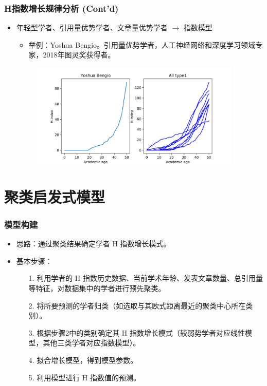 \documentclass[11pt,compress,t, xcolor=table]{beamer}
\begin{document}
\begin{frame}
	\frametitle{H指数增长规律分析 (Cont'd)}

\begin{itemize}
	\item 年轻型学者、引用量优势学者、文章量优势学者 $\rightarrow$ \textcolor{TsinghuaPurple}{指数模型}
	\begin{itemize}
		\item 举例：Yoshua Bengio。引用量优势学者，人工神经网络和深度学习领域专家，2018年图灵奖获得者。
	\end{itemize}
	
	\begin{figure}[H]
		\small
		\centering
		\includegraphics[width=10cm]{image/Yoshua Bengio.png}
	\end{figure}
\end{itemize}
\end{frame}

\section[聚类启发式模型]{聚类启发式模型}

\begin{frame}
	\frametitle{模型构建}
	
\begin{itemize}
	\item 思路：通过聚类结果确定学者 H 指数增长模式。
	\smallskip
	
	\item 基本步骤：
	\begin{itemize}
		\item[1.] 利用学者的 H 指数历史数据、当前学术年龄、发表文章数量、总引用量等特征，对数据集中的学者进行预先聚类。
		\smallskip
		\item[2.] 将所要预测的学者归类（如选取与其欧式距离最近的聚类中心所在类别）。
		\smallskip
		\item[3.] 根据步骤2中的类别确定其 H 指数增长模式（较弱势学者对应线性模型，其他三类学者对应指数模型）。
		\smallskip
		\item[4.] 拟合增长模型，得到模型参数。
		\smallskip
		\item[5.] 利用模型进行 H 指数值的预测。
	\end{itemize}
\end{itemize}
\end{frame}
\end{document}
